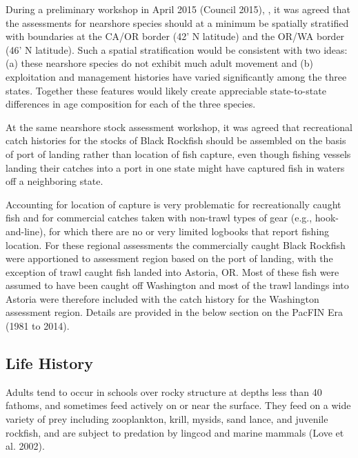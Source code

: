 \documentclass[11pt,
  english,
  letterpaper,
]{article}
\begin{document}
During a preliminary workshop in April 2015 (Council 2015), , it was agreed that the assessments for nearshore species should at a minimum be spatially stratified with boundaries at the CA/OR border (42' N latitude) and the OR/WA border (46' N latitude). Such a spatial stratification would be consistent with two ideas: (a) these nearshore species do not exhibit much adult movement and (b) exploitation and management histories have varied significantly among the three states. Together these features would likely create appreciable state-to-state differences in age composition for each of the three species.

At the same nearshore stock assessment workshop, it was agreed that recreational catch histories for the stocks of Black Rockfish should be assembled on the basis of port of landing rather than location of fish capture, even though fishing vessels landing their catches into a port in one state might have captured fish in waters off a neighboring state.

Accounting for location of capture is very problematic for recreationally caught fish and for commercial catches taken with non-trawl types of gear (e.g., hook-and-line), for which there are no or very limited logbooks that report fishing location. For these regional assessments the commercially caught Black Rockfish were apportioned to assessment region based on the port of landing, with the exception of trawl caught fish landed into Astoria, OR. Most of these fish were assumed to have been caught off Washington and most of the trawl landings into Astoria were therefore included with the catch history for the Washington assessment region. Details are provided in the below section on the PacFIN Era (1981 to 2014).

\hypertarget{life-history}{%
\subsection{Life History}\label{life-history}}

Adults tend to occur in schools over rocky structure at depths less than 40 fathoms, and sometimes feed actively on or near the surface. They feed on a wide variety of prey including zooplankton, krill, mysids, sand lance, and juvenile rockfish, and are subject to predation by lingcod and marine mammals (Love et al. 2002).
\end{document}
